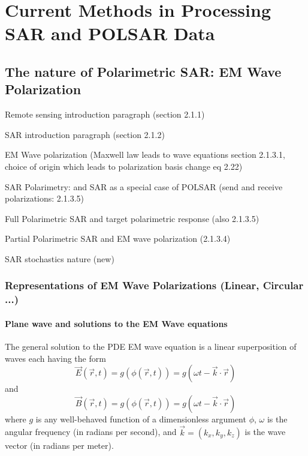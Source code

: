 \chapter{Current Methods in Processing SAR and POLSAR Data} %

\section{The nature of Polarimetric SAR: EM Wave Polarization}

Remote sensing introduction paragraph (section 2.1.1)

SAR introduction paragraph (section 2.1.2)

EM Wave polarization (Maxwell law leads to wave equations section 2.1.3.1, choice of origin which leads to polarization basis change eq 2.22)

SAR Polarimetry: and SAR as a special case of POLSAR (send and receive polarizations: 2.1.3.5)

Full Polarimetric SAR and target polarimetric response (also 2.1.3.5)

Partial Polarimetric SAR and EM wave polarization (2.1.3.4)

SAR stochastics nature (new)

\subsection{Representations of EM Wave Polarizations (Linear, Circular ...)}

\subsubsection{Plane wave and solutions to the EM Wave equations}

The general solution to the PDE EM wave equation is a linear superposition of waves each having the form
\begin{equation}
\vec{E}(\vec{r},t)=g(\phi(\vec{r},t)) = g(\omega t - \vec{k} \cdot \vec{r})
\end{equation} 
and
\begin{equation}
\vec{B}(\vec{r},t)=g(\phi(\vec{r},t)) = g(\omega t - \vec{k} \cdot \vec{r})
\end{equation}
where
	$g$ is any well-behaved function of a dimensionless argument $\phi$,
	$\omega$ is the angular frequency (in radians per second), and
	$\vec{k}= (k_x,k_y,k_z)$ is the wave vector (in radians per meter).

